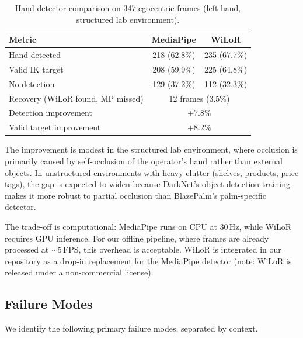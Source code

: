 \documentclass{ieeeaccess}
\begin{document}
\begin{table}[t]
\centering
\caption{Hand detector comparison on 347 egocentric frames (left hand,
structured lab environment).}
\label{tab:occlusion}
\begin{tabular}{lcc}
\toprule
\textbf{Metric} & \textbf{MediaPipe} & \textbf{WiLoR} \\
\midrule
Hand detected        & 218 (62.8\%) & 235 (67.7\%) \\
Valid IK target      & 208 (59.9\%) & 225 (64.8\%) \\
No detection         & 129 (37.2\%) & 112 (32.3\%) \\
\midrule
Recovery (WiLoR found, MP missed) & \multicolumn{2}{c}{12 frames (3.5\%)} \\
Detection improvement & \multicolumn{2}{c}{+7.8\%} \\
Valid target improvement & \multicolumn{2}{c}{+8.2\%} \\
\bottomrule
\end{tabular}
\end{table}

The improvement is modest in the structured lab environment, where
occlusion is primarily caused by self-occlusion of the operator's hand
rather than external objects. In unstructured environments with heavy
clutter (shelves, products, price tags), the gap is expected to widen
because DarkNet's object-detection training makes it more robust to
partial occlusion than BlazePalm's palm-specific detector.

The trade-off is computational: MediaPipe runs on CPU at 30\,Hz, while
WiLoR requires GPU inference. For our offline pipeline,
where frames are already processed at ${\sim}$5\,FPS, this overhead is
acceptable. WiLoR is integrated in our repository as a drop-in
replacement for the MediaPipe detector (note: WiLoR is released under
a non-commercial license).

\subsection{Failure Modes}

We identify the following primary failure modes, separated by context.
\end{document}
